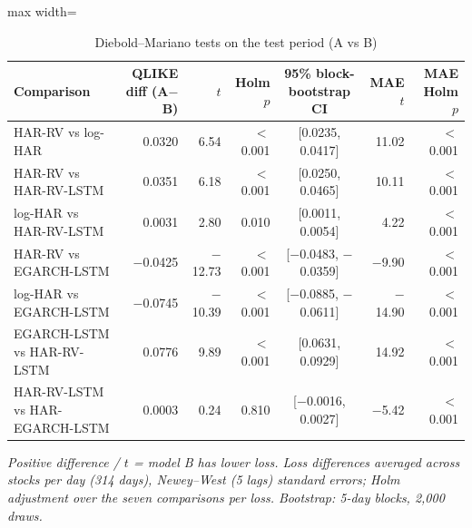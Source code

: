 \begin{table}[htbp]
\centering
\caption{Diebold--Mariano tests on the test period (A vs B)}
\label{tab:dm}
\small
\begin{adjustbox}{max width=\textwidth}
\begin{tabular}{lrrrcrr}
\toprule
Comparison & QLIKE diff (A$-$B) & $t$ & Holm $p$ & 95\% block-bootstrap CI & MAE $t$ & MAE Holm $p$ \\
\midrule
HAR-RV vs log-HAR & 0.0320 & 6.54 & $<$0.001 & [0.0235, 0.0417] & 11.02 & $<$0.001 \\
HAR-RV vs HAR-RV-LSTM & 0.0351 & 6.18 & $<$0.001 & [0.0250, 0.0465] & 10.11 & $<$0.001 \\
log-HAR vs HAR-RV-LSTM & 0.0031 & 2.80 & 0.010 & [0.0011, 0.0054] & 4.22 & $<$0.001 \\
HAR-RV vs EGARCH-LSTM & $-$0.0425 & $-$12.73 & $<$0.001 & [$-$0.0483, $-$0.0359] & $-$9.90 & $<$0.001 \\
log-HAR vs EGARCH-LSTM & $-$0.0745 & $-$10.39 & $<$0.001 & [$-$0.0885, $-$0.0611] & $-$14.90 & $<$0.001 \\
EGARCH-LSTM vs HAR-RV-LSTM & 0.0776 & 9.89 & $<$0.001 & [0.0631, 0.0929] & 14.92 & $<$0.001 \\
HAR-RV-LSTM vs HAR-EGARCH-LSTM & 0.0003 & 0.24 & 0.810 & [$-$0.0016, 0.0027] & $-$5.42 & $<$0.001 \\
\bottomrule
\end{tabular}
\end{adjustbox}
\par\smallskip\parbox{0.95\textwidth}{\footnotesize\itshape Positive difference / $t$ = model B has lower loss. Loss differences averaged across stocks per day (314 days), Newey--West (5 lags) standard errors; Holm adjustment over the seven comparisons per loss. Bootstrap: 5-day blocks, 2,000 draws.}
\end{table}
